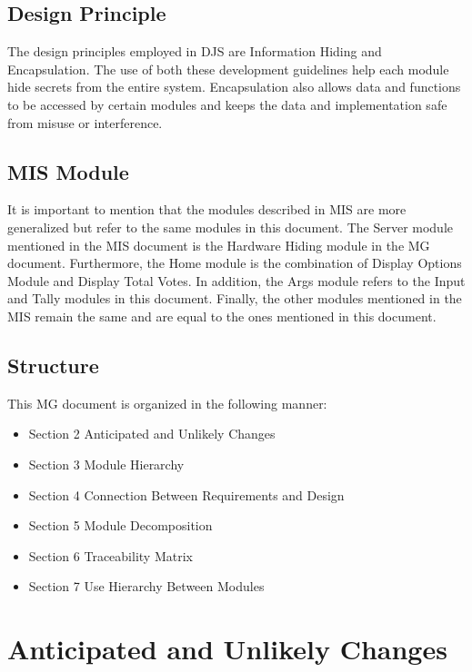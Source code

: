 \documentclass[12pt, titlepage]{article}
\begin{document}
\subsection{Design Principle}
The design principles employed in DJS are Information Hiding and Encapsulation. The use of both these development guidelines help each module hide secrets from the entire system. Encapsulation also allows data and functions to be accessed by certain modules and keeps the data and implementation safe from misuse or interference.
\subsection{MIS Module}
It is important to mention that the modules described in MIS are more generalized but refer to the same modules in this document. The Server module mentioned in the MIS document is the Hardware Hiding module in the MG document. Furthermore, the Home module is the combination of Display Options Module and Display Total Votes. In addition, the Args module refers to the Input and Tally modules in this document. Finally, the other modules mentioned in the MIS remain the same and are equal to the ones mentioned in this document.

\subsection{Structure}
This MG document is organized in the following manner:
\renewcommand\labelitemii{$\square$}
\begin{itemize}


\item Section 2 Anticipated and Unlikely Changes
\item Section 3 Module Hierarchy


\item Section 4 Connection Between Requirements and Design


\item Section 5 Module Decomposition


\item Section 6 Traceability Matrix


\item Section 7 Use Hierarchy Between Modules




\end{itemize}




\section{Anticipated and Unlikely Changes} \label{SecChange}
\end{document}
